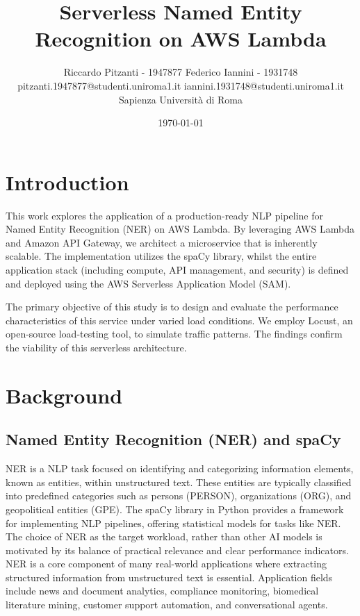 \documentclass[11pt,a4paper]{article}
\title{\vspace{-1.5em}\Large\bfseries Serverless Named Entity Recognition on AWS Lambda}
\author{Riccardo Pitzanti - 1947877 \quad \quad \quad \quad Federico Iannini - 1931748\\
  \normalsize pitzanti.1947877@studenti.uniroma1.it \quad iannini.1931748@studenti.uniroma1.it\\[0.25em]
  \normalsize Sapienza Università di Roma}
\date{\normalsize \today}
\begin{document}
\maketitle
\vspace{-1.5em}

\section{Introduction}
This work explores the application of a production-ready NLP pipeline for Named Entity Recognition (NER) on AWS Lambda. By leveraging AWS Lambda and Amazon API Gateway, we architect a microservice that is inherently scalable. The implementation utilizes the spaCy library, whilst the entire application stack (including compute, API management, and security) is defined and deployed using the AWS Serverless Application Model (SAM).

The primary objective of this study is to design and evaluate the performance characteristics of this service under varied load conditions. We employ Locust, an open-source load-testing tool, to simulate traffic patterns. The findings confirm the viability of this serverless architecture.

\section{Background}

\subsection{Named Entity Recognition (NER) and spaCy}
NER is a NLP task focused on identifying and categorizing information elements, known as entities, within unstructured text. These entities are typically classified into predefined categories such as persons (\textsf{PERSON}), organizations (\textsf{ORG}), and geopolitical entities (\textsf{GPE}). The spaCy library in Python provides a framework for implementing NLP pipelines, offering statistical models for tasks like NER.
The choice of NER as the target workload, rather than other AI models is motivated by its balance of practical relevance and clear performance indicators. NER is a core component of many real-world applications where extracting structured information from unstructured text is essential. Application fields include news and document analytics, compliance monitoring, biomedical literature mining, customer support automation, and conversational agents.
\end{document}
